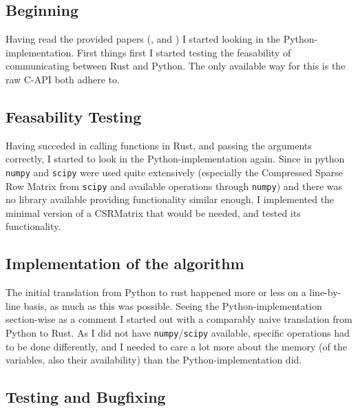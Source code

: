\subsection{Beginning}


Having read the provided papers (\cite{imakaev2012iterative},
\cite{lieberman2009comprehensive} and \cite{wingett2015hicup}) I started
looking in the Python-implementation. First things first I started testing the
feasability of communicating between Rust and Python. The only available way
for this is the raw C-API both adhere to.

\subsection{Feasability Testing}


Having succeded in calling functions in Rust, and passing the arguments
correctly, I started to look in the Python-implementation again. Since in
python \verb|numpy| and \verb|scipy| were used quite extensively (especially
the Compressed Sparse Row Matrix from \verb|scipy| and available operations
through \verb|numpy|) and there was no library available providing
functionality similar enough, I implemented the minimal version of a CSRMatrix
that would be needed, and tested its functionality.


\subsection{Implementation of the algorithm}



The initial translation from Python to rust happened more or less on a
line-by-line basis, as much as this was possible. Seeing the
Python-implementation section-wise as a comment I started out with a comparably
naive translation from Python to Rust. As I did not have
\verb|numpy|/\verb|scipy| available, specific operations had to be done
differently, and I needed to care a lot more about the memory (of the
variables, also their availability) than the Python-implementation did.


\subsection{Testing and Bugfixing}

